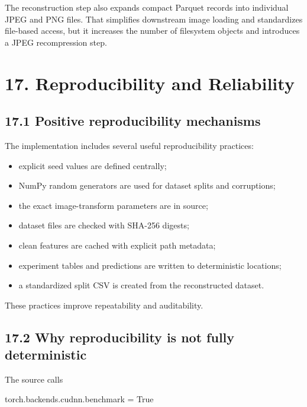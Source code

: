 \documentclass[
  11pt,
]{article}
\newenvironment{Shaded}{}{}
\newcommand{\NormalTok}[1]{#1}
\newcommand{\OperatorTok}[1]{\textcolor[rgb]{0.40,0.40,0.40}{#1}}
\newcommand{\VariableTok}[1]{\textcolor[rgb]{0.10,0.09,0.49}{#1}}
\providecommand{\tightlist}{%
  \setlength{\itemsep}{0pt}\setlength{\parskip}{0pt}}
\begin{document}
The reconstruction step also expands compact Parquet records into
individual JPEG and PNG files. That simplifies downstream image loading
and standardizes file-based access, but it increases the number of
filesystem objects and introduces a JPEG recompression step.

\section{17. Reproducibility and
Reliability}\label{reproducibility-and-reliability}

\subsection{17.1 Positive reproducibility
mechanisms}\label{positive-reproducibility-mechanisms}

The implementation includes several useful reproducibility practices:

\begin{itemize}
\tightlist
\item
  explicit seed values are defined centrally;
\item
  NumPy random generators are used for dataset splits and corruptions;
\item
  the exact image-transform parameters are in source;
\item
  dataset files are checked with SHA-256 digests;
\item
  clean features are cached with explicit path metadata;
\item
  experiment tables and predictions are written to deterministic
  locations;
\item
  a standardized split CSV is created from the reconstructed dataset.
\end{itemize}

These practices improve repeatability and auditability.

\subsection{17.2 Why reproducibility is not fully
deterministic}\label{why-reproducibility-is-not-fully-deterministic}

The source calls

\begin{Shaded}
\begin{Highlighting}[]
\NormalTok{torch.backends.cudnn.benchmark }\OperatorTok{=} \VariableTok{True}
\end{Highlighting}
\end{Shaded}
\end{document}
